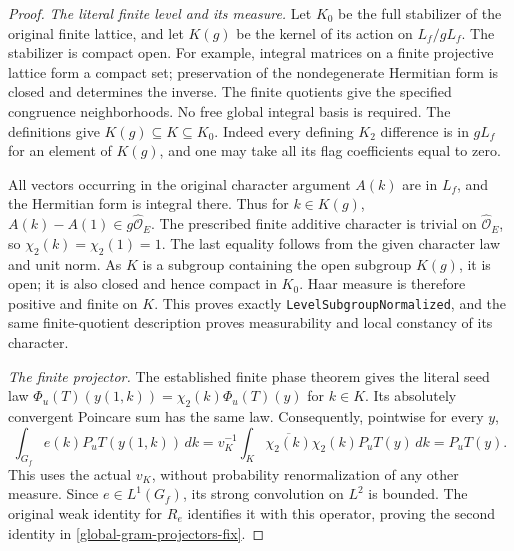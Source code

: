 \begin{proof}
\emph{The literal finite level and its measure.}
Let $K_0$ be the full stabilizer of the original finite lattice,
and let $K(g)$ be the kernel of its action on $L_f/gL_f$.
The stabilizer is compact open.  For example, integral matrices
on a finite projective lattice form a compact set; preservation
of the nondegenerate Hermitian form is closed and determines
the inverse.  The finite quotients give the specified congruence
neighborhoods.  No free global integral basis is required.
The definitions give $K(g)\subseteq K\subseteq K_0$.
Indeed every defining $K_2$ difference is in $gL_f$ for an
element of $K(g)$, and one may take all its flag coefficients
equal to zero.

All vectors occurring in the original character argument $A(k)$
are in $L_f$, and the Hermitian form is integral there.
Thus for $k\in K(g)$,
$A(k)-A(1)\in g\widehat{\mathcal O}_E$.  The prescribed
finite additive character is trivial on
$\widehat{\mathcal O}_E$, so $\chi_2(k)=\chi_2(1)=1$.
The last equality follows from the given character law and
unit norm.  As $K$ is a subgroup containing the open subgroup
$K(g)$, it is open; it is also closed and hence compact in
$K_0$.  Haar measure is therefore positive and finite on $K$.
This proves exactly \texttt{LevelSubgroupNormalized}, and the
same finite-quotient description proves measurability and local
constancy of its character.\cite{global-gram-projector-source}

\emph{The finite projector.}
The established finite phase theorem gives the literal seed law
$\Phi_u(T)(y(1,k))=\chi_2(k)\Phi_u(T)(y)$ for $k\in K$.
Its absolutely convergent Poincare sum has the same law.
Consequently, pointwise for every $y$,
\[
 \int_{G_f}e(k)P_uT(y(1,k))\,dk
  =v_K^{-1}\int_K\overline{\chi_2(k)}\chi_2(k)P_uT(y)\,dk
  =P_uT(y).
\]
This uses the actual $v_K$, without probability renormalization
of any other measure.  Since $e\in L^1(G_f)$, its strong
convolution on $L^2$ is bounded.  The original weak identity
for $R_e$ identifies it with this operator, proving the second
identity in \eqref{global-gram-projectors-fix}.


\end{proof}
